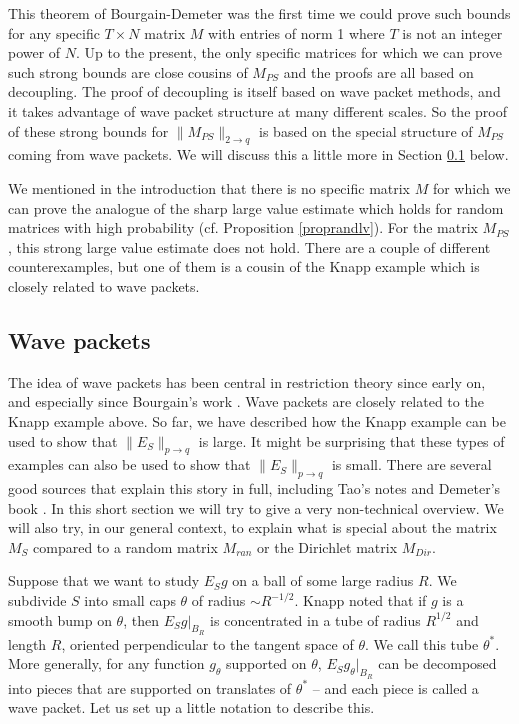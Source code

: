 \documentclass{amsart}
\begin{document}
This theorem of Bourgain-Demeter was the first time we could prove such bounds for any specific $T \times N$ matrix $M$ with entries of norm 1 where $T$ is not an integer power of $N$.   Up to the present,  the only specific matrices for which we can prove such strong bounds are close cousins of $M_{PS}$ and the proofs are all based on decoupling.  The proof of decoupling is itself based on wave packet methods, and it takes advantage of wave packet structure at many different scales.  So the proof of these strong bounds for $\| M_{PS} \|_{2 \rightarrow q}$ is based on the special structure of $M_{PS}$ coming from wave packets.  We will discuss this a little more in Section \ref{subsecwavepack} below.

We mentioned in the introduction that there is no specific matrix $M$ for which we can prove the analogue of the sharp large value estimate which holds for random matrices with high probability (cf. Proposition \ref{proprandlv}).  For the matrix $M_{PS}$, this strong large value estimate does not hold.  There are a couple of different counterexamples, but one of them is a cousin of the Knapp example which is closely related to wave packets.





\subsection{Wave packets} \label{subsecwavepack}

The idea of wave packets has been central in restriction theory since early on, and especially since Bourgain's work \cite{B3}.  Wave packets are closely related to the Knapp example above.  So far, we have described how the Knapp example can be used to show that $\| E_S \|_{p \rightarrow q}$ is large.   It might be surprising that these types of examples can also be used to show that $ \| E_S \|_{p \rightarrow q}$ is small.  There are several good sources that explain this story in full, including Tao's notes \cite{T} and Demeter's book \cite{De}.  In this short section we will try to give a very non-technical overview.  We will also try, in our general context, to explain what is special about the matrix $M_S$ compared to a random matrix $M_{ran}$ or the Dirichlet matrix $M_{Dir}$.  

Suppose that we want to study $E_S g$ on a ball of some large radius $R$.  We subdivide $S$ into small caps $\theta$ of radius $\sim R^{-1/2}$.  Knapp noted that if $g$ is a smooth bump on $\theta$, then $E_S g |_{B_R}$ is concentrated in a tube of radius $R^{1/2}$ and length $R$, oriented perpendicular to the tangent space of $\theta$.  We call this tube $\theta^*$.  More generally, for any function $g_\theta$ supported on $\theta$, $E_S g_\theta |_{B_R}$ can be decomposed into pieces that are supported on translates of $\theta^*$ -- and each piece is called a wave packet.  Let us set up a little notation to describe this.
\end{document}
